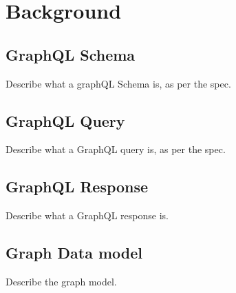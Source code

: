
\section{Background}
\subsection{GraphQL Schema}
Describe what a graphQL Schema is, as per the spec. 

\subsection{GraphQL Query}
Describe what a GraphQL query is, as per the spec.

\subsection{GraphQL Response}

Describe what a GraphQL response is.

\subsection{Graph Data model}

Describe the graph model.

